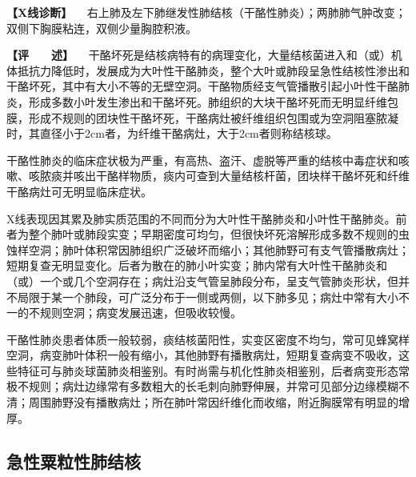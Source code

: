 \textbf{【X线诊断】}
　右上肺及左下肺继发性肺结核（干酪性肺炎）；两肺肺气肿改变；双侧下胸膜粘连，双侧少量胸腔积液。

\textbf{【评　　述】}
　干酪坏死是结核病特有的病理变化，大量结核菌进入和（或）机体抵抗力降低时，发展成为大叶性干酪肺炎，整个大叶或肺段呈急性结核性渗出和干酪坏死，其中有大小不等的无壁空洞。干酪物质经支气管播散引起小叶性干酪肺炎，形成多数小叶发生渗出和干酪坏死。肺组织的大块干酪坏死而无明显纤维包膜，形成不规则的团块性干酪坏死，干酪病灶被纤维组织包围或为空洞阻塞脓凝时，其直径小于2cm者，为纤维干酪病灶，大于2cm者则称结核球。

干酪性肺炎的临床症状极为严重，有高热、盗汗、虚脱等严重的结核中毒症状和咳嗽、咳脓痰并咳出干酪样物质，痰内可查到大量结核杆菌，团块样干酪坏死和纤维干酪病灶可无明显临床症状。

X线表现因其累及肺实质范围的不同而分为大叶性干酪肺炎和小叶性干酪肺炎。前者为整个肺叶或肺段实变；早期密度可均匀，但很快坏死溶解形成多数不规则的虫蚀样空洞；肺叶体积常因肺组织广泛破坏而缩小；其他肺野可有支气管播散病灶；短期复查无明显变化。后者为散在的肺小叶实变；肺内常有大叶性干酪肺炎和（或）一个或几个空洞存在；病灶沿支气管呈肺段分布，呈支气管肺炎形状，但并不局限于某一个肺段，可广泛分布于一侧或两侧，以下肺多见；病灶中常有大小不一的不规则空洞；病变发展迅速，但吸收较慢。

干酪性肺炎患者体质一般较弱，痰结核菌阳性，实变区密度不均匀，常可见蜂窝样空洞，病变肺叶体积一般有缩小，其他肺野有播散病灶，短期复查病变不吸收，这些特征可与肺炎球菌肺炎相鉴别。有时尚需与机化性肺炎相鉴别，后者病变形态常极不规则；病灶边缘常有多数粗大的长毛刺向肺野伸展，并常可见部分边缘模糊不清；周围肺野没有播散病灶；所在肺叶常因纤维化而收缩，附近胸膜常有明显的增厚。

\subsection{急性粟粒性肺结核}


